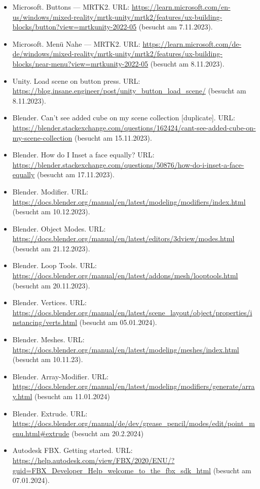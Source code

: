 \begin{itemize}
    \item Microsoft. Buttons — MRTK2. URL: \url{https://learn.microsoft.com/en-us/windows/mixed-reality/mrtk-unity/mrtk2/features/ux-building-blocks/button?view=mrtkunity-2022-05} (besucht am 7.11.2023).
    \item Microsoft. Menü Nahe — MRTK2. URL: \url{https://learn.microsoft.com/de-de/windows/mixed-reality/mrtk-unity/mrtk2/features/ux-building-blocks/near-menu?view=mrtkunity-2022-05} (besucht am 8.11.2023).
    \item Unity. Load scene on button press. URL: \url{https://blog.insane.engineer/post/unity_button_load_scene/} (besucht am 8.11.2023).
    \item Blender. Can't see added cube on my scene collection [duplicate]. URL: \url{https://blender.stackexchange.com/questions/162424/cant-see-added-cube-on-my-scene-collection} (besucht am 15.11.2023).
    \item Blender. How do I Inset a face equally? URL: \url{https://blender.stackexchange.com/questions/50876/how-do-i-inset-a-face-equally} (besucht am 17.11.2023).
    \item Blender. Modifier. URL: \url{https://docs.blender.org/manual/en/latest/modeling/modifiers/index.html} (besucht am 10.12.2023).
    \item Blender. Object Modes. URL: \url{https://docs.blender.org/manual/en/latest/editors/3dview/modes.html} (besucht am 21.12.2023).
    \item Blender. Loop Tools. URL: \url{https://docs.blender.org/manual/en/latest/addons/mesh/looptools.html} (besucht am 20.11.2023).
    \item Blender. Vertices. URL: \url{https://docs.blender.org/manual/en/latest/scene_layout/object/properties/instancing/verts.html} (besucht am 05.01.2024).
    \item Blender. Meshes. URL: \url{https://docs.blender.org/manual/en/latest/modeling/meshes/index.html} (besucht am 10.11.23).
    \item Blender. Array-Modifier. URL: \url{https://docs.blender.org/manual/en/latest/modeling/modifiers/generate/array.html} (besucht am 11.01.2024)
    \item Blender. Extrude. URL: \url{https://docs.blender.org/manual/de/dev/grease_pencil/modes/edit/point_menu.html#extrude} (besucht am 20.2.2024)
    \item Autodesk FBX. Getting started. URL: \url{https://help.autodesk.com/view/FBX/2020/ENU/?guid=FBX_Developer_Help_welcome_to_the_fbx_sdk_html} (besucht am 07.01.2024).

\end{itemize}
